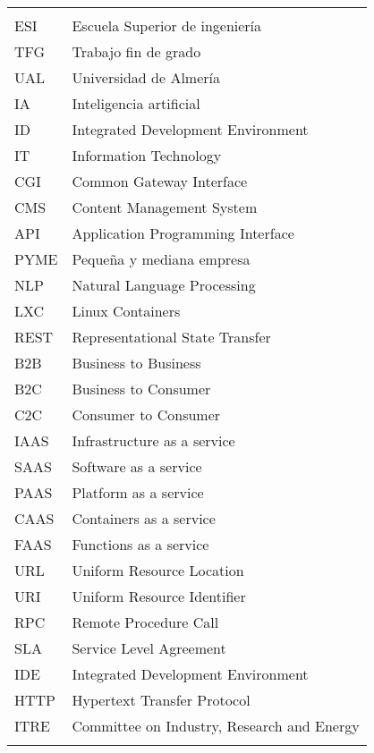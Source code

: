 \begin{tabular}{ l   |    l  }
	

&\\
   ESI & Escuela Superior de ingeniería \\
   TFG & Trabajo fin de grado\\
   UAL & Universidad de Almería \\
   IA & Inteligencia artificial \\
   ID & Integrated Development Environment \\
   IT & Information Technology \\
   CGI & Common Gateway Interface \\
   CMS & Content Management System \\
   API & Application Programming Interface \\
   PYME & Pequeña y mediana empresa \\
   NLP & Natural Language Processing \\
   LXC & Linux Containers \\
   REST & Representational State Transfer \\
   B2B & Business to Business \\
   B2C & Business to Consumer \\
   C2C & Consumer to Consumer \\
   IAAS & Infrastructure as a service \\
   SAAS & Software as a service \\
   PAAS & Platform as a service \\
   CAAS & Containers as a service \\
   FAAS & Functions as a service \\
   URL & Uniform Resource Location \\
   URI & Uniform Resource Identifier \\
   RPC & Remote Procedure Call \\
   SLA & Service Level Agreement \\
   IDE & Integrated Development Environment \\
   HTTP & Hypertext Transfer Protocol \\
   ITRE & Committee on Industry, Research and Energy \\
&\\

\end{tabular}
